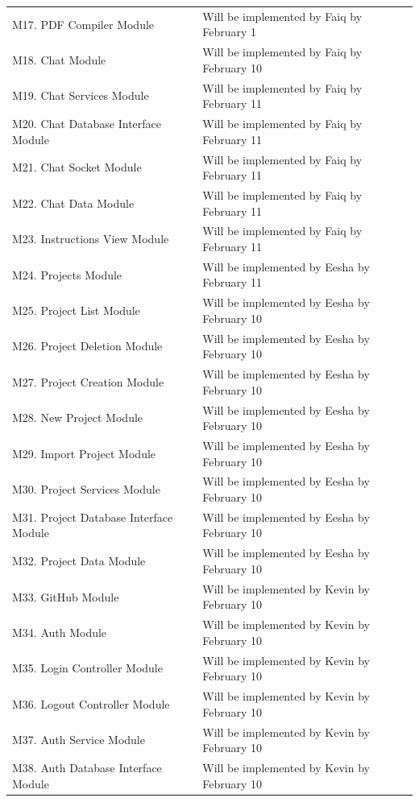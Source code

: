 \documentclass[12pt, titlepage]{article}
\begin{document}
\begin{longtable}{p{} p{}}
		M17. PDF Compiler Module &  Will be implemented by Faiq by February 1  \\
		M18. Chat Module &  Will be implemented by Faiq by February 10  \\
		M19. Chat Services Module &  Will be implemented by Faiq by February 11  \\
		M20. Chat Database Interface Module &  Will be implemented by Faiq by February 11  \\
		M21. Chat Socket Module &  Will be implemented by Faiq by February 11  \\
		M22. Chat Data Module &  Will be implemented by Faiq by February 11  \\
		M23. Instructions View Module &  Will be implemented by Faiq by February 11  \\
		M24. Projects Module &  Will be implemented by Eesha by February 11  \\
		M25. Project List Module &  Will be implemented by Eesha by February 10  \\
		M26. Project Deletion Module &  Will be implemented by Eesha by February 10  \\
		M27. Project Creation Module &  Will be implemented by Eesha by February 10  \\
		M28. New Project Module &  Will be implemented by Eesha by February 10  \\
		M29. Import Project Module  &  Will be implemented by Eesha by February 10 \\
		M30. Project Services Module &  Will be implemented by Eesha by February 10  \\
		M31. Project Database Interface Module &  Will be implemented by Eesha by February 10  \\
		M32. Project Data Module &  Will be implemented by Eesha by February 10  \\
		M33. GitHub Module &  Will be implemented by Kevin by February 10  \\
		M34. Auth Module &  Will be implemented by Kevin by February 10  \\
		M35. Login Controller Module &  Will be implemented by Kevin by February 10  \\
		M36. Logout Controller Module &  Will be implemented by Kevin by February 10  \\
		M37. Auth Service Module &  Will be implemented by Kevin by February 10  \\
		M38. Auth Database Interface Module &  Will be implemented by Kevin by February 10  \\

\end{longtable}
\end{document}
